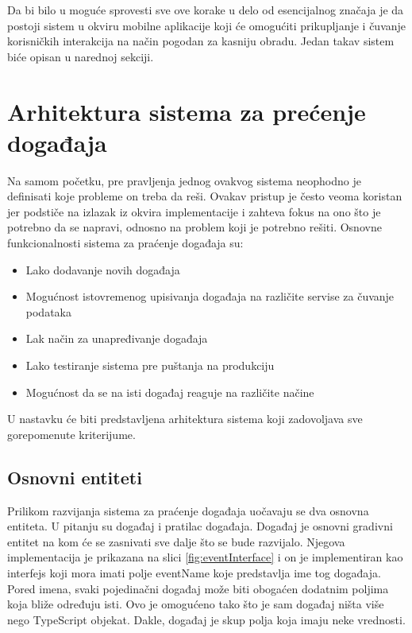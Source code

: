 \documentclass[12pt,oneside]{memoir}
\begin{document}
Da bi bilo u moguće sprovesti sve ove korake u delo od esencijalnog značaja je da postoji sistem u okviru mobilne aplikacije koji će omogućiti prikupljanje i čuvanje korisničkih interakcija na način pogodan za kasniju obradu. Jedan takav sistem biće opisan u narednoj sekciji.

\section{Arhitektura sistema za prećenje događaja}

Na samom početku, pre pravljenja jednog ovakvog sistema neophodno je definisati koje probleme on treba da reši. Ovakav pristup je često veoma koristan jer podstiče na izlazak iz okvira implementacije i zahteva fokus na ono što je potrebno da se napravi, odnosno na problem koji je potrebno rešiti.
\newline
\newline
Osnovne funkcionalnosti sistema za praćenje događaja su:
\begin{itemize}
\item Lako dodavanje novih događaja
\item Mogućnost istovremenog upisivanja događaja na različite servise za čuvanje podataka
\item Lak način za unapređivanje događaja
\item Lako testiranje sistema pre puštanja na produkciju
\item Mogućnost da se na isti događaj reaguje na različite načine 
\end{itemize}

U nastavku će biti predstavljena arhitektura sistema koji zadovoljava sve gorepomenute kriterijume.

\subsection{Osnovni entiteti}

Prilikom razvijanja sistema za praćenje događaja uočavaju se dva osnovna entiteta. U pitanju su događaj i pratilac događaja. Događaj je osnovni gradivni entitet na kom će se zasnivati sve dalje što se bude razvijalo. Njegova implementacija je prikazana na slici \ref{fig:eventInterface} i on je implementiran kao interfejs koji mora imati polje eventName koje predstavlja ime tog događaja. Pored imena, svaki pojedinačni događaj može biti obogaćen dodatnim poljima koja bliže određuju isti. Ovo je omogućeno tako što je sam događaj ništa više nego TypeScript objekat. Dakle, događaj je skup polja koja imaju neke vrednosti. 
\end{document}
